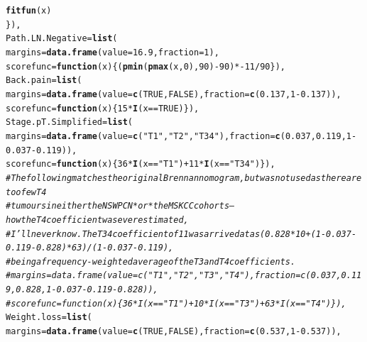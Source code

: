 \documentclass{article}\usepackage[]{graphicx}\usepackage[]{color}
\makeatletter
\newcommand{\hlnum}[1]{\textcolor[rgb]{0.686,0.059,0.569}{#1}}%
\newcommand{\hlstr}[1]{\textcolor[rgb]{0.192,0.494,0.8}{#1}}%
\newcommand{\hlcom}[1]{\textcolor[rgb]{0.678,0.584,0.686}{\textit{#1}}}%
\newcommand{\hlopt}[1]{\textcolor[rgb]{0,0,0}{#1}}%
\newcommand{\hlstd}[1]{\textcolor[rgb]{0.345,0.345,0.345}{#1}}%
\newcommand{\hlkwa}[1]{\textcolor[rgb]{0.161,0.373,0.58}{\textbf{#1}}}%
\newcommand{\hlkwc}[1]{\textcolor[rgb]{0.333,0.667,0.333}{#1}}%
\newcommand{\hlkwd}[1]{\textcolor[rgb]{0.737,0.353,0.396}{\textbf{#1}}}%
\newenvironment{kframe}{%
 \def\at@end@of@kframe{}%
 \ifinner\ifhmode%
  \def\at@end@of@kframe{\end{minipage}}%
  \begin{minipage}{\columnwidth}%
 \fi\fi%
 \def\FrameCommand##1{\hskip\@totalleftmargin \hskip-\fboxsep
 \colorbox{shadecolor}{##1}\hskip-\fboxsep
     \hskip-\linewidth \hskip-\@totalleftmargin \hskip\columnwidth}%
 \MakeFramed {\advance\hsize-\width
   \@totalleftmargin\z@ \linewidth\hsize
   \@setminipage}}%
 {\par\unskip\endMakeFramed%
 \at@end@of@kframe}
\newenvironment{knitrout}{}{} %
\makeatother
\begin{document}
\begin{knitrout}
\begin{kframe}
\begin{alltt}
                        \hlkwd{fitfun}\hlstd{(x)}
                \hlstd{\}),}
        \hlkwc{Path.LN.Negative} \hlstd{=} \hlkwd{list}\hlstd{(}
                \hlkwc{margins} \hlstd{=} \hlkwd{data.frame}\hlstd{(}\hlkwc{value} \hlstd{=} \hlnum{16.9}\hlstd{,} \hlkwc{fraction} \hlstd{=} \hlnum{1}\hlstd{),}
                \hlkwc{scorefunc} \hlstd{=} \hlkwa{function}\hlstd{(}\hlkwc{x}\hlstd{) \{ (}\hlkwd{pmin}\hlstd{(}\hlkwd{pmax}\hlstd{(x,} \hlnum{0}\hlstd{),} \hlnum{90}\hlstd{)}\hlopt{-}\hlnum{90}\hlstd{)}\hlopt{*-}\hlnum{11}\hlopt{/}\hlnum{90} \hlstd{\}),}
        \hlkwc{Back.pain} \hlstd{=} \hlkwd{list}\hlstd{(}
                \hlkwc{margins} \hlstd{=} \hlkwd{data.frame}\hlstd{(}\hlkwc{value} \hlstd{=} \hlkwd{c}\hlstd{(}\hlnum{TRUE}\hlstd{,} \hlnum{FALSE}\hlstd{),} \hlkwc{fraction} \hlstd{=} \hlkwd{c}\hlstd{(}\hlnum{0.137}\hlstd{,} \hlnum{1}\hlopt{-}\hlnum{0.137}\hlstd{)),}
                \hlkwc{scorefunc} \hlstd{=} \hlkwa{function}\hlstd{(}\hlkwc{x}\hlstd{) \{} \hlnum{15}\hlopt{*}\hlkwd{I}\hlstd{(x} \hlopt{==} \hlnum{TRUE}\hlstd{) \}),}
        \hlkwc{Stage.pT.Simplified} \hlstd{=} \hlkwd{list}\hlstd{(}
                \hlkwc{margins} \hlstd{=} \hlkwd{data.frame}\hlstd{(}\hlkwc{value} \hlstd{=} \hlkwd{c}\hlstd{(}\hlstr{"T1"}\hlstd{,} \hlstr{"T2"}\hlstd{,} \hlstr{"T34"}\hlstd{),} \hlkwc{fraction} \hlstd{=} \hlkwd{c}\hlstd{(}\hlnum{0.037}\hlstd{,} \hlnum{0.119}\hlstd{,} \hlnum{1}\hlopt{-}\hlnum{0.037}\hlopt{-}\hlnum{0.119}\hlstd{)),}
                \hlkwc{scorefunc} \hlstd{=} \hlkwa{function}\hlstd{(}\hlkwc{x}\hlstd{) \{} \hlnum{36}\hlopt{*}\hlkwd{I}\hlstd{(x} \hlopt{==} \hlstr{"T1"}\hlstd{)} \hlopt{+} \hlnum{11}\hlopt{*}\hlkwd{I}\hlstd{(x} \hlopt{==} \hlstr{"T34"}\hlstd{) \}),}
                \hlcom{# The following matches the original Brennan nomogram, but was not used as there are too few T4}
                \hlcom{# tumours in either the NSWPCN *or* the MSKCC cohorts -- how the T4 coefficient was ever estimated,}
                \hlcom{# I'll never know.  The T34 coefficient of 11 was arrived at as (0.828*10+(1-0.037-0.119-0.828)*63)/(1-0.037-0.119),}
                \hlcom{# being a frequency-weighted average of the T3 and T4 coefficients.}
                \hlcom{# margins = data.frame(value = c("T1", "T2", "T3", "T4"), fraction = c(0.037, 0.119, 0.828, 1-0.037-0.119-0.828)),}
                \hlcom{# scorefunc = function(x) \{ 36*I(x == "T1") + 10*I(x == "T3") + 63*I(x == "T4") \}),}
        \hlkwc{Weight.loss} \hlstd{=} \hlkwd{list}\hlstd{(}
                \hlkwc{margins} \hlstd{=} \hlkwd{data.frame}\hlstd{(}\hlkwc{value} \hlstd{=} \hlkwd{c}\hlstd{(}\hlnum{TRUE}\hlstd{,} \hlnum{FALSE}\hlstd{),} \hlkwc{fraction} \hlstd{=} \hlkwd{c}\hlstd{(}\hlnum{0.537}\hlstd{,} \hlnum{1}\hlopt{-}\hlnum{0.537}\hlstd{)),}

\end{alltt}
\end{kframe}
\end{knitrout}
\end{document}
